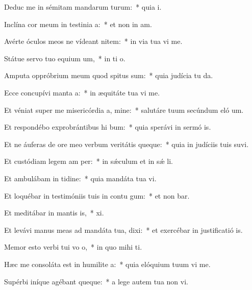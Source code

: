 \item Deduc me in sémitam mandarum turum:~* quia  i.
\item Inclína cor meum in testinia a:~* et non in am.
\item Avérte óculos meos ne vídeant nitem:~* in via tua vi me.
\item Státue servo tuo equium um,~* in ti o.
\item Amputa oppróbrium meum quod spitus sum:~* quia judícia tu da.
\item Ecce concupívi manta a:~* in æquitáte tua vi me.
\item Et véniat super me misericórdia a, mine:~* salutáre tuum secúndum eló um.
\item Et respondébo exprobrántibus hi bum:~* quia sperávi in sermó is.
\item Et ne áuferas de ore meo verbum veritátis queque:~* quia in judíciis tuis suvi.
\item Et custódiam legem am per:~* in sǽculum et in sǽ li.
\item Et ambulábam in tidine:~* quia mandáta tua vi.
\item Et loquébar in testimóniis tuis in contu gum:~* et non bar.
\item Et meditábar in mantis is,~*  xi.
\item Et levávi manus meas ad mandáta tua,  dixi:~* et exercébar in justificatió is.
\item Memor esto verbi tui vo o,~* in quo mihi  ti.
\item Hæc me consoláta est in humilite a:~* quia elóquium tuum vi me.
\item Supérbi iníque agébant queque:~* a lege autem tua non vi.
